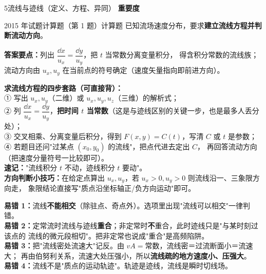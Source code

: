 \begin{kaodian}{5}{流线与迹线（定义、方程、异同）}
\textbf{重要度 }\quad{}\quad{}

\begin{zhenti}{2015 年试题计算题（第 1 题）}{计算题}
已知流场速度分布，要求\textbf{建立流线方程并判断流动方向}。
\end{zhenti}
\noindent\textbf{答案要点：}列出 $\dfrac{\dd x}{u_x}=\dfrac{\dd y}{u_y}$，把 $t$ 当常数分离变量积分，
得含积分常数的流线族；流动方向由 $u_x,u_y$ 在当前点的符号确定（速度矢量指向即前进方向）。

\begin{banfa}
\textbf{求流线方程的四步套路（可直接背）：}\\
① 写出 $u_x,u_y$（二维）或 $u_x,u_y,u_z$（三维）的解析式；\\
② 列 $\dfrac{\dd x}{u_x}=\dfrac{\dd y}{u_y}$，\textbf{把时间 $t$ 当常数}（这是与迹线区别的关键一步，也是最多人丢分处）；\\
③ 交叉相乘、分离变量后积分，得到 $F(x,y)=C(t)$，写清 $C$ 或 $t$ 是参数；\\
④ 若题目还问"过某点 $(x_0,y_0)$ 的流线"，把点代进去定出 $C$，
再回答流动方向（把速度分量符号一比较即可）。\\
\textbf{速记：}"流线积分 $t$ 不动，迹线积分 $t$ 要动"。\\
\textbf{方向判断小技巧：}在给定点算出 $u_x,u_y$，若 $u_x>0,u_y>0$ 则流线沿一、三象限方向走，
象限结论直接写"质点沿坐标轴正/负方向运动"即可。
\end{banfa}

\begin{yicuo}
\textbf{易错 1：}流线\textbf{不能相交}（除驻点、奇点外）。选项里出现"流线可以相交"一律判错。\\
\textbf{易错 2：}定常流时流线与迹线\textbf{重合}；非定常时\textbf{不}重合，此时迹线只是"与某时刻过该点的
流线的微元段相切"。把非定常也说成"重合"是高频陷阱。\\
\textbf{易错 3：}把"流线密处流速大"记反。由 $vA=$常数，流线密＝过流断面小＝流速大；
再由伯努利关系，流速大处压强小，所以\textbf{流线疏的地方速度小、压强大}。\\
\textbf{易错 4：}流线不是"质点的运动轨迹"。轨迹是迹线，流线是瞬时切线场。
\end{yicuo}
\end{kaodian}

